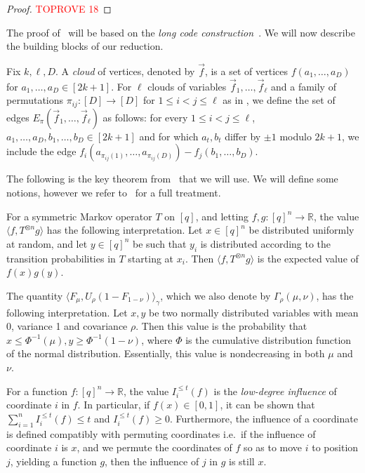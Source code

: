 \documentclass[a4paper,11pt, DIV=11]{scrartcl}
\theoremstyle{plain}
\theoremstyle{definition}
\begin{document}
\begin{proof}\textcolor{red}{TOPROVE 18}\end{proof}

The proof of~ will be based on the \emph{long code
construction}~\cite{BGS:98}. We will now describe the building blocks of our reduction.

\begin{definition}
    Fix $k, \ell, D$. A \emph{cloud} of vertices, denoted by $\vec{f}$, is a set of vertices $f(a_1, \ldots, a_D)$ for $a_1, \ldots, a_D \in [2k + 1]$. For $\ell$ clouds of variables $\vec{f}_1, \ldots, \vec{f}_\ell$ and a family of permutations $\pi_{ij} : [D] \to [D]$ for $1 \leq i < j \leq \ell$ as in , we define the set of edges $E_\pi(\vec{f}_1, \ldots, \vec{f}_\ell)$ as follows: for every $1 \leq i < j \leq \ell$, $a_1, \ldots, a_D, b_1, \ldots, b_D \in [2k + 1]$ and for which $a_t, b_t$ differ by $\pm 1$ modulo $2k + 1$, we include the edge $f_i(a_{\pi_{ij}(1)}, \ldots, a_{\pi_{ij}(D)}) - f_j(b_1, \ldots, b_D)$.
\end{definition}

The following is the key theorem from~\cite{Dinur09:sicomp} that we will use. We will define some notions, however we refer to~\cite{Dinur09:sicomp} for a full treatment.

\begin{definition}
    For a symmetric Markov operator $T$ on $[q]$, and letting $f, g : [q]^n \to \mathbb{R}$, the value $\langle f, T^{\otimes n} g \rangle$ has the following interpretation. Let $x \in [q]^n$ be distributed uniformly at random, and let $y \in [q]^n$ be such that $y_i$ is distributed according to the transition probabilities in $T$ starting at $x_i$. Then $\langle f, T^{\otimes n} g \rangle$ is the expected value of $f(x) g(y)$.

    The quantity $\langle F_\mu, U_\rho(1 - F_{1 - \nu})\rangle_\gamma$, which we also denote by $\Gamma_\rho(\mu, \nu)$, has the following interpretation. Let $x, y$ be two normally distributed variables with mean 0, variance 1 and covariance $\rho$. Then this value is the probability that $x \leq \Phi^{-1}(\mu), y \geq \Phi^{-1}(1 - \nu)$, where $\Phi$ is the cumulative distribution function of the normal distribution. Essentially, this value is nondecreasing in both $\mu$ and $\nu$.

    For a function $f : [q]^n \to \mathbb{R}$, the value $I_i^{\leq t}(f)$ is the \emph{low-degree influence} of coordinate $i$ in $f$. In particular, if $f(x) \in [0, 1]$, it can be shown that $\sum_{i = 1}^n I_i^{\leq t}(f) \leq t$ and $I_i^{\leq t}(f) \geq 0$. Furthermore, the influence of a coordinate is defined compatibly with permuting coordinates i.e.~if the influence of coordinate $i$ is $x$, and we permute the coordinates of $f$ so as to move $i$ to position $j$, yielding a function $g$, then the influence of $j$ in $g$ is still $x$.
\end{definition}
\end{document}
